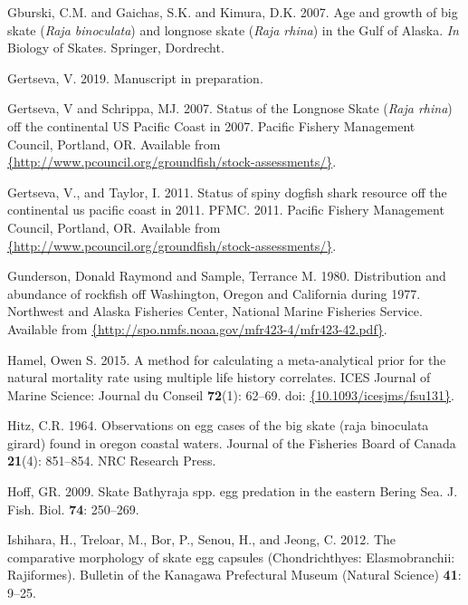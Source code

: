 \documentclass[12pt,]{article}
\begin{document}
\leavevmode\hypertarget{ref-Gburski2007}{}%
Gburski, C.M. and Gaichas, S.K. and Kimura, D.K. 2007. Age and growth of
big skate (\emph{Raja binoculata}) and longnose skate (\emph{Raja
rhina}) in the Gulf of Alaska. \emph{In} Biology of Skates. Springer,
Dordrecht.

\leavevmode\hypertarget{ref-Gertseva2019}{}%
Gertseva, V. 2019. Manuscript in preparation.

\leavevmode\hypertarget{ref-Gertseva2007}{}%
Gertseva, V and Schrippa, MJ. 2007. Status of the Longnose Skate
(\emph{Raja rhina}) off the continental US Pacific Coast in 2007.
Pacific Fishery Management Council, Portland, OR. Available from
\href{\%7Bhttp://www.pcouncil.org/groundfish/stock-assessments/\%7D}{\{http://www.pcouncil.org/groundfish/stock-assessments/\}}.

\leavevmode\hypertarget{ref-Gertseva2011}{}%
Gertseva, V., and Taylor, I. 2011. Status of spiny dogfish shark
resource off the continental us pacific coast in 2011. PFMC. 2011.
Pacific Fishery Management Council, Portland, OR. Available from
\href{\%7Bhttp://www.pcouncil.org/groundfish/stock-assessments/\%7D}{\{http://www.pcouncil.org/groundfish/stock-assessments/\}}.

\leavevmode\hypertarget{ref-Gunderson1980}{}%
Gunderson, Donald Raymond and Sample, Terrance M. 1980. Distribution and
abundance of rockfish off Washington, Oregon and California during 1977.
Northwest and Alaska Fisheries Center, National Marine Fisheries
Service. Available from
\href{\%7Bhttp://spo.nmfs.noaa.gov/mfr423-4/mfr423-42.pdf\%7D}{\{http://spo.nmfs.noaa.gov/mfr423-4/mfr423-42.pdf\}}.

\leavevmode\hypertarget{ref-Hamel2015}{}%
Hamel, Owen S. 2015. A method for calculating a meta-analytical prior
for the natural mortality rate using multiple life history correlates.
ICES Journal of Marine Science: Journal du Conseil \textbf{72}(1):
62--69. doi:
\href{https://doi.org/\%7B10.1093/icesjms/fsu131\%7D}{\{10.1093/icesjms/fsu131\}}.

\leavevmode\hypertarget{ref-Hitz1964}{}%
Hitz, C.R. 1964. Observations on egg cases of the big skate (raja
binoculata girard) found in oregon coastal waters. Journal of the
Fisheries Board of Canada \textbf{21}(4): 851--854. NRC Research Press.

\leavevmode\hypertarget{ref-Hoff2009}{}%
Hoff, GR. 2009. Skate Bathyraja spp. egg predation in the eastern Bering
Sea. J. Fish. Biol. \textbf{74}: 250--269.

\leavevmode\hypertarget{ref-Ishihara2012}{}%
Ishihara, H., Treloar, M., Bor, P., Senou, H., and Jeong, C. 2012. The
comparative morphology of skate egg capsules (Chondrichthyes:
Elasmobranchii: Rajiformes). Bulletin of the Kanagawa Prefectural Museum
(Natural Science) \textbf{41}: 9--25.
\end{document}
